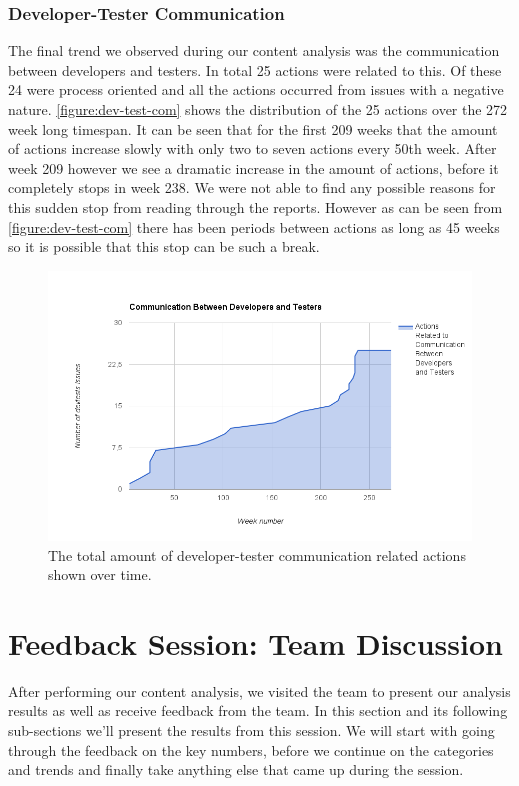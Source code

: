 \subsubsection{Developer-Tester Communication}
The final trend we observed during our content analysis was the communication between developers and testers. In total 25 actions were related to this. Of these 24 were process oriented and all the actions occurred from issues with a negative nature. 
\autoref{figure:dev-test-com} shows the distribution of the 25 actions over the 272 week long timespan. It can be seen that for the first 209 weeks that the amount of actions increase slowly with only two to seven actions every 50th week. After week 209 however we see a dramatic increase in the amount of actions, before it completely stops in week 238. We were not able to find any possible reasons for this sudden stop from reading through the reports. However as can be seen from \autoref{figure:dev-test-com} there has been periods between actions as long as 45 weeks so it is possible that this stop can be such a break.  

\begin{figure}[!h]
	\centering
	\includegraphics[width=\textwidth, keepaspectratio]{figures/devtestcom.png}
	\caption{The total amount of developer-tester communication related actions shown over time.}
	\label{figure:dev-test-com}
\end{figure}

\clearpage

\section{Feedback Session: Team Discussion}
After performing our content analysis, we visited the team to present our analysis results as well as receive feedback from the team. In this section and its following sub-sections we'll present the results from this session. We will start with going through the feedback on the key numbers, before we continue on the categories and trends and finally take anything else that came up during the session. 

